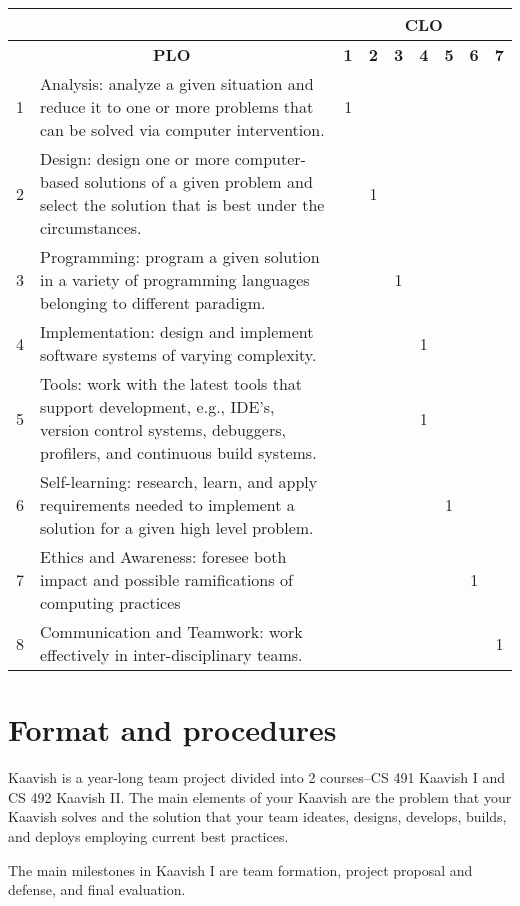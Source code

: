 \documentclass[a4paper]{article}
\newcommand{\new}[1]{{#1}}
\begin{document}
\noindent\small
\begin{tabularx}{\linewidth}{|l|X||*{7}{c|}}
  \cline{3-9}
  \multicolumn{2}{c}{} & \multicolumn{7}{|c|}{\textbf{CLO}} \\\hline
  \multicolumn{2}{|c||}{\textbf{PLO}} & \textbf{1} & \textbf{2} & \textbf{3} & \textbf{4} & \textbf{5} & \textbf{6} & \textbf{7} \\\hline
 1 & Analysis: analyze a given situation and reduce it to one or more problems that can be solved via computer intervention. & 1 &&&&&&\\\hline
2 & Design: design one or more computer-based solutions of a given problem and select the solution that is best under the circumstances. &&1&&&&& \\\hline
 3 & Programming: program a given solution in a variety of programming languages belonging to different paradigm. &&&1&&&& \\\hline
 4 & Implementation: design and implement software systems of varying complexity. &&&&1&&& \\\hline
 5 & Tools: work with the latest tools that support development, e.g., IDE's, version control systems, debuggers, profilers, and continuous build systems. &&&&1&&& \\\hline
 6 & Self-learning: research, learn, and apply requirements needed to implement a solution for a given high level problem. &&&&&1&& \\\hline
 7 & Ethics and Awareness: foresee both impact and possible ramifications of computing practices &&&&&&1& \\\hline
 8 & Communication and Teamwork: work effectively in inter-disciplinary teams. &  &  &  &  &  & &1\\\hline
\end{tabularx}
\normalsize

\section{Format and procedures}
\label{sec:format}

\new{Kaavish is a year-long team project divided into 2 courses--CS 491 Kaavish I and CS 492 Kaavish II. The main elements of your Kaavish are the problem that your Kaavish solves and the solution that your team ideates, designs, develops, builds, and deploys employing current best practices.}

\new{The main milestones in Kaavish I are team formation, project proposal and defense, and final evaluation.}
\end{document}
